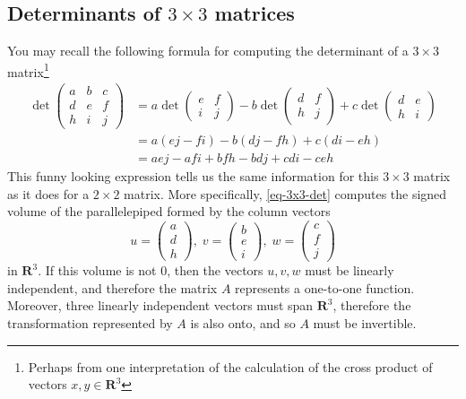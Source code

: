 \documentclass[12pt]{article}
\numberwithin{equation}{subsection}
\numberwithin{figure}{subsection}
\theoremstyle{note}
\begin{document}
\subsection{Determinants of $3\times 3$ matrices} You may recall the following formula for computing the determinant of a $3\times 3$ matrix\footnote{Perhaps from one interpretation of the calculation of the cross product of vectors $x,y\in\mathbf{R}^3$}
\begin{align} \label{eq-3x3-det} \det \begin{pmatrix} a & b & c \\ d & e & f \\ h & i & j\end{pmatrix} &= a\det \begin{pmatrix} e & f \\ i & j \end{pmatrix} - b \det \begin{pmatrix} d & f \\ h & j \end{pmatrix} + c \det\begin{pmatrix} d & e \\ h & i \end{pmatrix} \nonumber \\
&= a (ej-fi) - b(dj-fh)+c(di-eh) \nonumber \\
&= aej -afi +bfh-bdj +cdi -ceh
\end{align}
This funny looking expression tells us the same information for this $3\times 3$ matrix as it does for a $2 \times 2$ matrix. More specifically, \eqref{eq-3x3-det} computes the signed volume of the parallelepiped formed by the column vectors \[ u=\begin{pmatrix} a \\ d \\ h \end{pmatrix}, \;  v=\begin{pmatrix} b \\ e \\ i \end{pmatrix},\;  w=\begin{pmatrix} c \\ f \\ j \end{pmatrix}\] in $\mathbf{R}^3$. If this volume is not 0, then the vectors $u,v,w$ must be linearly independent, and therefore the matrix $A$ represents a one-to-one function. Moreover, three linearly independent vectors must span $\mathbf{R}^3$, therefore the transformation represented by $A$ is also onto, and so $A$ must be invertible. 
\end{document}
